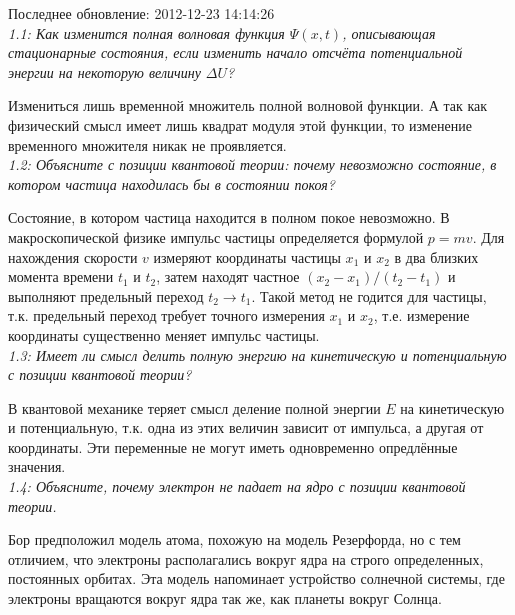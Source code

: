 





	Последнее обновление: 2012-12-23 14:14:26
	\\

	\emph{ 1.1: Как изменится полная волновая функция \( \Psi(x,t) \),
        описывающая стационарные состояния, если изменить начало отсчёта
        потенциальной энергии на некоторую величину \( \Delta U \)? }

		Измениться лишь временной множитель полной волновой функции. 
		А так как физический смысл имеет лишь квадрат модуля этой функции,
		то изменение временного множителя никак не проявляется. \\
	
    \emph{1.2: Объясните с позиции квантовой теории: почему невозможно 
    	состояние, в котором частица находилась бы в состоянии покоя?}

        Состояние, в котором частица находится в полном покое невозможно.
        В макроскопической физике импульс частицы определяется формулой
        \( p = mv \). Для нахождения скорости \( v \) измеряют 
        координаты частицы \( x_1 \) и \( x_2 \) в два близких момента
        времени \( t_1 \) и \( t_2 \), затем находят частное
        \( (x_2 - x_1)/(t_2 - t_1) \) и выполняют предельный переход
        \( t_2 \rightarrow t_1 \). Такой метод не годится для частицы, 
        т.к. предельный переход требует точного измерения \( x_1 \) и 
        \( x_2 \), т.е. измерение координаты существенно меняет импульс
        частицы. \\

    \emph{1.3: Имеет ли смысл делить полную энергию на кинетическую и 
        потенциальную с позиции квантовой теории?}

        В квантовой механике теряет смысл деление полной энергии \( E \)
        на кинетическую и потенциальную, т.к. одна из этих величин
        зависит от импульса, а другая от координаты. Эти переменные не 
        могут иметь одновременно опредлённые значения. \\

    \emph{1.4: Объясните, почему электрон не падает на ядро с позиции 
    	квантовой теории.}

        Бор предположил модель атома, похожую на модель Резерфорда, но 
        с тем отличием, что электроны располагались вокруг ядра 
        на строго определенных, постоянных орбитах. Эта модель 
        напоминает устройство солнечной системы, где электроны вращаются 
        вокруг ядра так же, как планеты вокруг Солнца. \\\\\\\\

